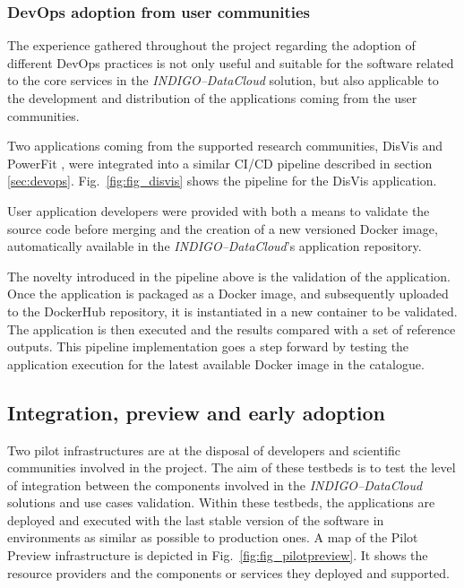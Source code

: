 \documentclass[journal]{IEEEtran}
\begin{document}
\subsubsection{DevOps adoption from user communities}

The experience gathered throughout the project regarding the adoption of
different DevOps practices is not only useful and suitable for the software related
to the core services in the {\sl INDIGO--DataCloud} solution, but also applicable to the
development and distribution of the applications coming from the user communities.

Two applications coming from the supported research communities,
DisVis \cite{disvis} and PowerFit \cite{powerfit}, were
integrated into a similar CI/CD pipeline described in section \ref{sec:devops}.
Fig.~\ref{fig:fig_disvis} shows the pipeline for the DisVis application.

User application developers were provided with both a means to validate the
source code before merging and the creation of a new versioned Docker image,
automatically available in the {\sl INDIGO--DataCloud}'s application repository.

The novelty introduced in the pipeline above is the validation of the application.
Once the application is packaged as a Docker image, and subsequently uploaded
to the DockerHub repository, it is instantiated in a new container to be validated.
The application is then executed and the results compared with a set of reference outputs.
This pipeline implementation goes a step forward by testing the application
execution for the latest available Docker image in the catalogue.

\subsection{Integration, preview and early adoption}

Two pilot infrastructures are at the disposal of developers and scientific
communities involved in the project. The aim of these testbeds is to test the
level of integration between the components involved in the {\sl INDIGO--DataCloud}
solutions and use cases validation. Within these testbeds, the applications are deployed
and executed
with the last stable version of the software in environments as similar as
possible to production ones. A map of the Pilot Preview
infrastructure is depicted in Fig.~\ref{fig:fig_pilotpreview}. It shows the
resource providers and the components or services they deployed and supported.
\end{document}
